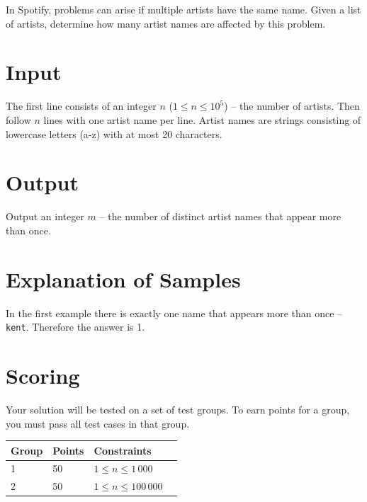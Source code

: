 
In Spotify, problems can arise if multiple artists have the same name. Given a list of artists, determine how many artist names are affected by this problem.

\section*{Input}

The first line consists of an integer $n$ ($1 \leq n \leq 10^5$) -- the number of artists. Then follow $n$ lines with one artist name per line. Artist names are strings consisting of lowercase letters (a-z) with at most 20 characters.

\section*{Output}

Output an integer $m$ -- the number of distinct artist names that appear more than once.

\section*{Explanation of Samples}

In the first example there is exactly one name that appears more than once -- \texttt{kent}. Therefore the answer is 1.

\section*{Scoring}

Your solution will be tested on a set of test groups. To earn points for a group,
you must pass all test cases in that group.

\begin{tabular}{| l | l | l | l |}
\hline
Group & Points & Constraints \\ \hline
1     & 50         & $ 1 \le n \le 1\,000$ \\ \hline
2     & 50         & $ 1 \le n \le 100\,000$ \\ \hline
\end{tabular}
